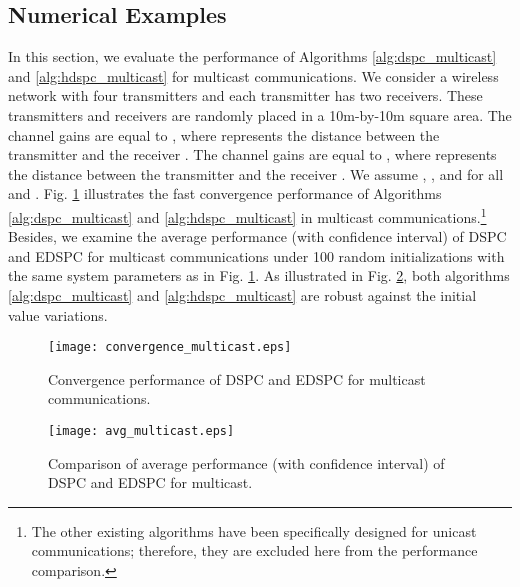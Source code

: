 \documentclass[10pt,journal,letterpaper,compsoc]{IEEEtran}
\begin{document}
{{\subsection{Numerical Examples}
In this section, we evaluate the performance of Algorithms \ref{alg:dspc_multicast} and \ref{alg:hdspc_multicast} for multicast communications. We consider a wireless network with four transmitters and each transmitter has two receivers.
These transmitters and receivers are randomly placed in a 10m-by-10m square area. The channel gains  are equal to , where  represents the distance between the transmitter  and the receiver .
The channel gains  are equal to , where  represents the distance between the transmitter  and the receiver . We assume , , and  for all  and .
Fig. \ref{fig:convergence_multicast} illustrates the fast convergence performance of Algorithms \ref{alg:dspc_multicast} and \ref{alg:hdspc_multicast} in multicast communications.\footnote{The other existing algorithms have been specifically designed for unicast communications; therefore, they are excluded here from the performance comparison.} Besides, we examine the average performance (with confidence interval) of DSPC and EDSPC for multicast communications under 100 random initializations with the same system parameters as in Fig. \ref{fig:convergence_multicast}. As illustrated in Fig. \ref{fig:comparison_multicast}, both algorithms \ref{alg:dspc_multicast} and \ref{alg:hdspc_multicast} are robust against the initial value variations.

\begin{figure}[t]
\begin{center}
\vspace{-0.0cm}\hspace{-0.0cm} {\texttt{[image: convergence\_multicast.eps]}}\hspace{-0.0cm}
\caption{Convergence performance of DSPC and EDSPC for multicast communications.}
\label{fig:convergence_multicast}
\end{center}
\end{figure}




\begin{figure}[t]
\begin{center}
\vspace{0cm}\hspace{0cm} {\texttt{[image: avg\_multicast.eps]}}\hspace{-0cm}
\vspace{-1.5cm} \caption{Comparison of average performance (with confidence interval) of DSPC and EDSPC for multicast.}\vspace{-0cm}
\label{fig:comparison_multicast}
\end{center}
\end{figure}



}}
\end{document}
